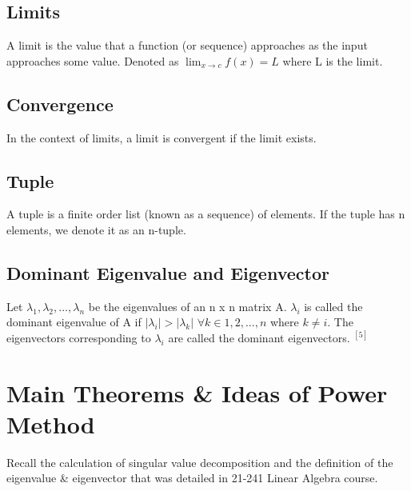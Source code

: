 \documentclass[12pt]{article}
\begin{document}
\subsection{Limits}
\vspace{-8pt}
A limit is the value that a function (or sequence) approaches as the input approaches some value. Denoted as $\lim_{x \to c} f(x) = L$ where L is the limit.
\vspace{-8pt}
\subsection{Convergence}
\vspace{-8pt}
In the context of limits, a limit is convergent if the limit exists.
\vspace{-8pt}
\subsection{Tuple}
\vspace{-8pt}
A tuple is a finite order list (known as a sequence) of elements. If the tuple has n elements, we denote it as an n-tuple.
\vspace{-8pt}
\subsection{Dominant Eigenvalue and Eigenvector}
\vspace{-3pt}
Let $\lambda_1, \lambda_2,..., \lambda_n$ be the eigenvalues of an n x n matrix A. $\lambda_i$ is called the dominant eigenvalue of A if $|\lambda_i| > |\lambda_k|$  $\forall k \in {1,2,...,n}$ where $k \neq i$. The eigenvectors corresponding to $\lambda_i$ are called the dominant eigenvectors. $^{[5]}$

\vspace{-8pt}

\vspace{3pt}
\section{Main Theorems \& Ideas of Power Method}
\vspace{-8pt}
Recall the calculation of singular value decomposition and the definition of the eigenvalue \& eigenvector that was detailed in 21-241 Linear Algebra course. 
\vspace{-3pt}
\end{document}
